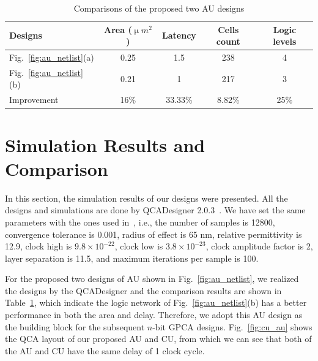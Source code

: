 \documentclass[9pt,journal,compsoc]{IEEEtran}
\begin{document}
\begin{table}[t]
\caption{Comparisons of the proposed two AU designs}
    \centering
    \begin{tabularx}{\linewidth}{Xcccc}
            \hline
        Designs & Area ($\upmu m^{2}$)& Latency & Cells count & Logic levels \\
        \hline
        Fig.~\ref{fig:au_netlist}(a) & 0.25      & 1.5            & 238               & 4            \\
        Fig.~\ref{fig:au_netlist}(b) & 0.21      & 1              & 217               &3             \\
        \hline
        Improvement & 16\%   & 33.33\%        & 8.82\%           & 25\%      \\
        \hline
    \end{tabularx}
    \label{tab:au}
\end{table}

\section{Simulation Results and Comparison}
In this section, the simulation results of our designs were presented.
All the designs and simulations are done by QCADesigner 2.0.3~\cite{QCAdesigner}.
We have set the same parameters with the ones used in~\cite{2}, i.e.,
the number of samples is 12800, convergence tolerance is 0.001, radius of effect is 65 nm, relative permittivity is 12.9, clock high is $9.8 \times 10^{-22}$,  clock low is $3.8 \times 10^{-23}$, clock amplitude factor is 2, layer separation is 11.5, and maximum iterations per sample is 100.

For the proposed two designs of AU shown in Fig.~\ref{fig:au_netlist}, we realized the designs by the QCADesigner and the comparison results are shown in Table~\ref{tab:au}, which indicate the logic network of Fig.~\ref{fig:au_netlist}(b) has a better performance in both the area and delay. Therefore, we adopt this AU design as the building block for the subsequent $n$-bit GPCA designs.
Fig.~\ref{fig:cu_au} shows the QCA layout of our proposed AU and CU, from which we can see that both of the AU and CU have the same delay of 1 clock cycle.
\end{document}
